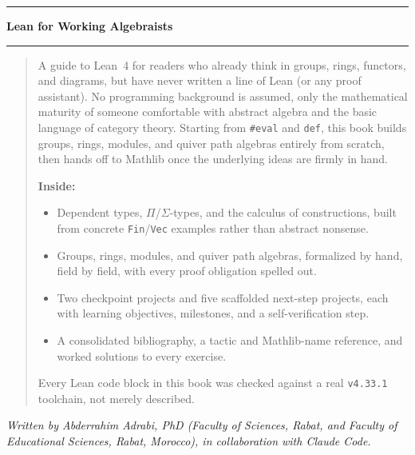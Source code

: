 \clearpage
\thispagestyle{empty}
\null\vfill

\begin{center}
{\color{ruleblue}\rule{0.5\textwidth}{1pt}}\par
\vspace{0.4cm}
{\normalfont\Large\bfseries Lean for Working Algebraists\par}
\vspace{0.4cm}
{\color{ruleblue}\rule{0.5\textwidth}{1pt}}
\end{center}

\vspace{0.8cm}
\begin{quote}
\noindent
A guide to Lean~4 for readers who already think in groups, rings,
functors, and diagrams, but have never written a line of Lean (or any
proof assistant). No programming background is assumed, only the
mathematical maturity of someone comfortable with abstract algebra and
the basic language of category theory. Starting from \texttt{\#eval} and
\texttt{def}, this book builds groups, rings, modules, and quiver path
algebras entirely from scratch, then hands off to Mathlib once the
underlying ideas are firmly in hand.

\medskip
\noindent\textbf{Inside:}
\begin{itemize}
\item Dependent types, $\Pi$/$\Sigma$-types, and the calculus of
  constructions, built from concrete \texttt{Fin}/\texttt{Vec} examples
  rather than abstract nonsense.
\item Groups, rings, modules, and quiver path algebras, formalized by
  hand, field by field, with every proof obligation spelled out.
\item Two checkpoint projects and five scaffolded next-step projects,
  each with learning objectives, milestones, and a self-verification
  step.
\item A consolidated bibliography, a tactic and Mathlib-name reference,
  and worked solutions to every exercise.
\end{itemize}

\medskip
\noindent Every Lean code block in this book was checked against a real
\texttt{v4.33.1} toolchain, not merely described.
\end{quote}

\vspace{0.8cm}
\begin{center}
{\normalfont\itshape Written by Abderrahim Adrabi, PhD (Faculty of
Sciences, Rabat, and Faculty of Educational Sciences, Rabat, Morocco),
in collaboration with Claude Code.\par}
\end{center}

\vfill\null
